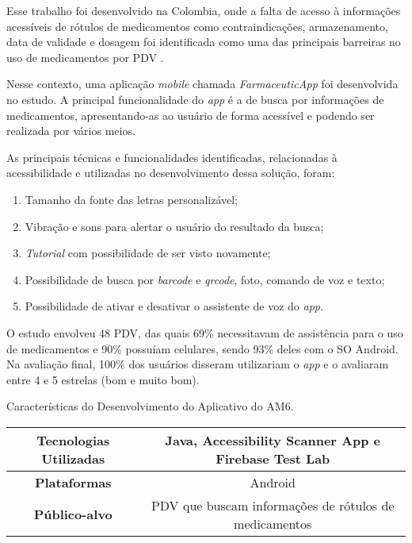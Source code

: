 Esse trabalho foi desenvolvido na Colombia, onde a falta de acesso à informações acessíveis
de rótulos de medicamentos como contraindicações, armazenamento, data de validade e dosagem foi identificada como uma
das principais barreiras no uso de medicamentos por PDV \cite{Amariles2020}.

Nesse contexto, uma aplicação \emph{mobile} chamada \emph{FarmaceuticApp} foi desenvolvida no estudo.
A principal funcionalidade do \emph{app} é a de busca por informações de medicamentos, apresentando-as
ao usuário de forma acessível e podendo ser realizada por vários meios.

As principais técnicas e funcionalidades identificadas, relacionadas à acessibilidade e utilizadas no desenvolvimento dessa solução, foram:

\begin{enumerate}
  \item Tamanho da fonte das letras personalizável;
  \item Vibração e sons para alertar o usuário do resultado da busca;
  \item \emph{Tutorial} com possibilidade de ser visto novamente;
  \item Possibilidade de busca por \emph{barcode} e \emph{qrcode}, foto, comando de voz e texto;
  \item Possibilidade de ativar e desativar o assistente de voz do \emph{app}.
\end{enumerate}

O estudo envolveu 48 PDV, das quais 69\% necessitavam de assistência para o uso de medicamentos e 90\% possuíam celulares, sendo 93\%  deles com o SO Android.
Na avaliação final, 100\% dos usuários disseram utilizariam o \emph{app} e o avaliaram entre 4 e 5 estrelas (bom e muito bom).

\begin{quadro}[htb!]
  \caption{\label{qua-car-am6}Características do Desenvolvimento do Aplicativo do AM6.}
  \begin{tabular}{|c|c|}
    \hline
    \textbf{Tecnologias Utilizadas} & Java, Accessibility Scanner App e Firebase Test Lab   \\ \hline
    \textbf{Plataformas}            & Android                                               \\ \hline
    \textbf{Público-alvo}           & PDV que buscam informações de rótulos de medicamentos \\
    \hline
  \end{tabular}
\end{quadro}

